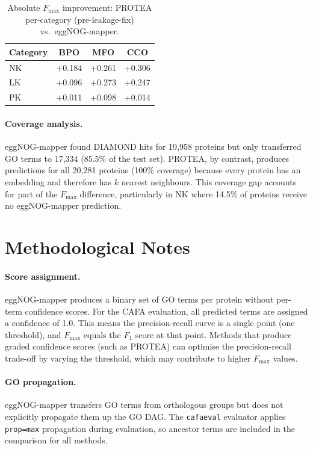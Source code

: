 \begin{table}[htbp]
  \centering
  \caption[Absolute Fmax improvement vs.\ eggNOG-mapper]{Absolute $F_{\max}$ improvement: PROTEA per-category (pre-leakage-fix) vs.\ eggNOG-mapper.}
  \label{tab:emapper-delta}
  \begin{tabular}{lccc}
    \toprule
    \textbf{Category} & \textbf{BPO} & \textbf{MFO} & \textbf{CCO} \\
    \midrule
    NK & +0.184 & +0.261 & +0.306 \\
    LK & +0.096 & +0.273 & +0.247 \\
    PK & +0.011 & +0.098 & +0.014 \\
    \bottomrule
  \end{tabular}
\end{table}

\paragraph{Coverage analysis.} eggNOG-mapper found DIAMOND hits for 19{,}958
proteins but only transferred GO terms to 17{,}334 (85.5\% of the test set).
PROTEA, by contrast, produces predictions for all 20{,}281 proteins (100\%
coverage) because every protein has an embedding and therefore has $k$
nearest neighbours. This coverage gap accounts for part of the $F_{\max}$
difference, particularly in NK where 14.5\% of proteins receive no
eggNOG-mapper prediction.

\section{Methodological Notes}
\label{app:ext-notes}

\paragraph{Score assignment.}
eggNOG-mapper produces a binary set of GO terms per protein without
per-term confidence scores. For the CAFA evaluation, all predicted terms are
assigned a confidence of 1.0. This means the precision-recall curve is a
single point (one threshold), and $F_{\max}$ equals the $F_1$ score at that
point. Methods that produce graded confidence scores (such as PROTEA) can
optimise the precision-recall trade-off by varying the threshold, which may
contribute to higher $F_{\max}$ values.

\paragraph{GO propagation.}
eggNOG-mapper transfers GO terms from orthologous groups but does not
explicitly propagate them up the GO DAG. The \texttt{cafaeval} evaluator
applies \texttt{prop=max} propagation during evaluation, so ancestor terms
are included in the comparison for all methods.

